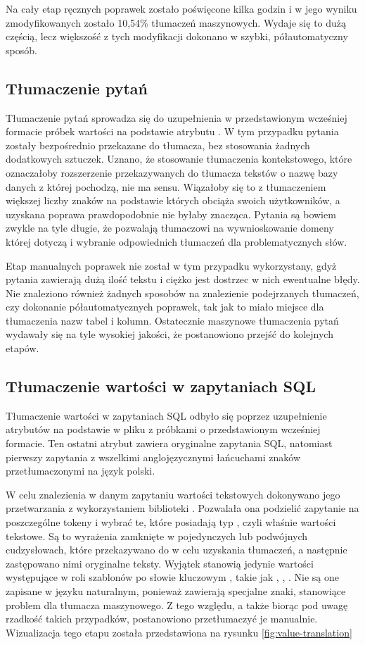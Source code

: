 Na cały etap ręcznych poprawek zostało poświęcone kilka godzin i w jego wyniku zmodyfikowanych zostało 10,54\% tłumaczeń maszynowych. Wydaje się to dużą częścią, lecz większość z tych modyfikacji dokonano w szybki, półautomatyczny sposób.


\subsection{Tłumaczenie pytań}
Tłumaczenie pytań sprowadza się do uzupełnienia w przedstawionym wcześniej formacie próbek wartości  na podstawie atrybutu . W tym przypadku pytania zostały bezpośrednio przekazane do tłumacza, bez stosowania żadnych dodatkowych sztuczek. Uznano, że stosowanie tłumaczenia kontekstowego, które oznaczałoby rozszerzenie przekazywanych do tłumacza tekstów o nazwę bazy danych z której pochodzą, nie ma sensu. Wiązałoby się to z tłumaczeniem większej liczby znaków na podstawie których  obciąża swoich użytkowników, a uzyskana poprawa prawdopodobnie nie byłaby znacząca. Pytania są bowiem zwykle na tyle długie, że pozwalają tłumaczowi na wywnioskowanie domeny której dotyczą i wybranie odpowiednich tłumaczeń dla problematycznych słów. 

Etap manualnych poprawek nie został w tym przypadku wykorzystany, gdyż pytania zawierają dużą ilość tekstu i ciężko jest dostrzec w nich ewentualne błędy. Nie znaleziono również żadnych sposobów na znalezienie podejrzanych tłumaczeń, czy dokonanie półautomatycznych poprawek, tak jak to miało miejsce dla tłumaczenia nazw tabel i kolumn. Ostatecznie maszynowe tłumaczenia pytań wydawały się na tyle wysokiej jakości, że postanowiono przejść do kolejnych etapów.

\subsection{Tłumaczenie wartości w zapytaniach SQL}
Tłumaczenie wartości w zapytaniach SQL odbyło się poprzez uzupełnienie atrybutów  na podstawie  w pliku z próbkami o przedstawionym wcześniej formacie. Ten ostatni atrybut zawiera oryginalne zapytania SQL, natomiast pierwszy zapytania z wszelkimi anglojęzycznymi łańcuchami znaków przetłumaczonymi na język polski.

W celu znalezienia w danym zapytaniu wartości tekstowych dokonywano jego przetwarzania z wykorzystaniem biblioteki . Pozwalała ona podzielić zapytanie na poszczególne tokeny i wybrać te, które posiadają typ , czyli właśnie wartości tekstowe. Są to wyrażenia zamknięte w pojedynczych lub podwójnych cudzysłowach, które przekazywano do  w celu uzyskania tłumaczeń, a następnie zastępowano nimi oryginalne teksty. Wyjątek stanowią jedynie wartości występujące w roli szablonów po słowie kluczowym , takie jak , , . Nie są one zapisane w języku naturalnym, ponieważ zawierają specjalne znaki, stanowiące problem dla tłumacza maszynowego. Z tego względu, a także biorąc pod uwagę rzadkość takich przypadków, postanowiono przetłumaczyć je manualnie. Wizualizacja tego etapu została przedstawiona na rysunku \ref{fig:value-translation}

